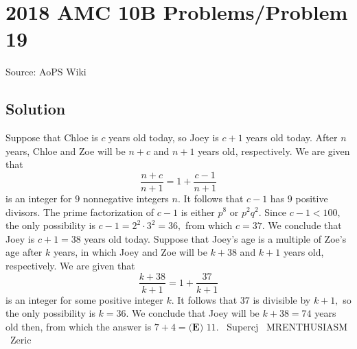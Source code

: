 \documentclass[12pt]{article}
\begin{document}
\section*{{2018 AMC 10B Problems/Problem 19}}
Source: AoPS Wiki

\subsection*{Solution}
Suppose that Chloe is $c$ years old today, so Joey is $c+1$ years old today. After $n$ years, Chloe and Zoe will be $n+c$ and $n+1$ years old, respectively. We are given that \[\frac{n+c}{n+1}=1+\frac{c-1}{n+1}\] is an integer for $9$ nonnegative integers $n.$ It follows that $c-1$ has $9$ positive divisors. The prime factorization of $c-1$ is either $p^8$ or $p^2q^2.$ Since $c-1<100,$ the only possibility is $c-1=2^2\cdot3^2=36,$ from which $c=37.$ We conclude that Joey is $c+1=38$ years old today. Suppose that Joey's age is a multiple of Zoe's age after $k$ years, in which Joey and Zoe will be $k+38$ and $k+1$ years old, respectively. We are given that \[\frac{k+38}{k+1}=1+\frac{37}{k+1}\] is an integer for some positive integer $k.$ It follows that $37$ is divisible by $k+1,$ so the only possibility is $k=36.$ We conclude that Joey will be $k+38=74$ years old then, from which the answer is $7+4=\boxed{\textbf{(E) }11}.$ ~Supercj ~MRENTHUSIASM ~Zeric
\end{document}
